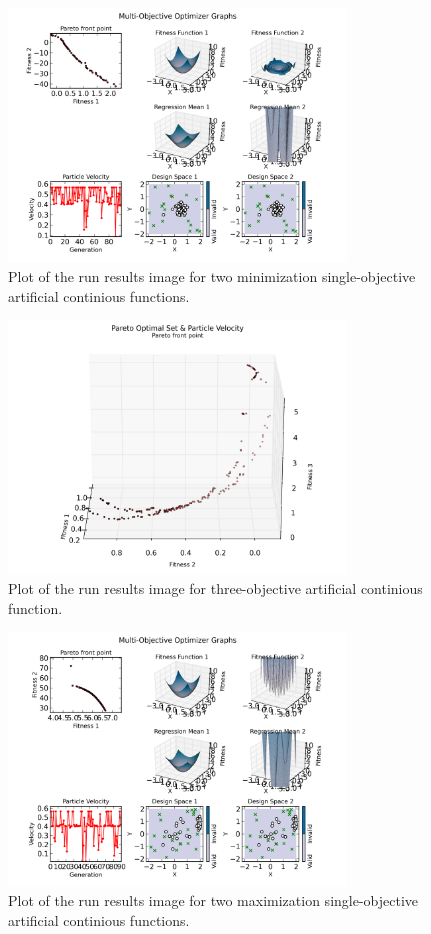 \documentclass[11pt, runningheads,a4paper]{llncs}
\begin{document}
\begin{figure}
        \centering
    \centering
\includegraphics[width=0.8\textwidth]{./figs/shron.png}
        \caption{Plot of the run results image for two minimization single-objective artificial continious functions.}\label{fig:shron}
\end{figure}

\begin{figure}
        \centering
    \centering
\includegraphics[width=0.8\textwidth]{./figs/3d.png}
        \caption{Plot of the run results image for three-objective artificial continious function.}\label{fig:3d}
\end{figure}

\begin{figure}
        \centering
    \centering
\includegraphics[width=0.8\textwidth]{./figs/max.png}
        \caption{Plot of the run results image for two maximization single-objective artificial continious functions.}\label{fig:max}
\end{figure}
\end{document}
